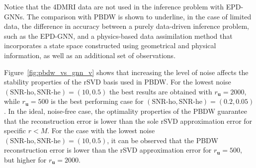 Notice that the 4DMRI data are not used in the inference problem with EPD-GNNs. The comparison with PBDW is shown to underline, in the case of limited data, the difference in accuracy between a purely data-driven inference problem, such as the EPD-GNN,  and a physics-based data assimilation method that incorporates a state space
constructed using geometrical and physical information, as well as an additional set of observations.

Figure~\ref{fig:pbdw_vs_gnn_v} shows that increasing the level of noise affects the stability properties of the rSVD basis used in PBDW. For the lowest noise
$(\text{SNR-ho}, \text{SNR-he})=(10, 0.5)$  the best results are obtained with $r_{\mathbf u} = 2000$, while $r_{\mathbf u} = 500$ is the best performing case for $(\text{SNR-ho}, \text{SNR-he})=(0.2, 0.05)$.
%
In the ideal, noise-free case, the optimality properties of the PBDW guarantee that the reconstruction error is lower than the sole rSVD approximation error 
for specific $r<M$. For the case with the lowest noise $(\text{SNR-ho}, \text{SNR-he})=(10, 0.5)$, it can be observed that the PBDW reconstruction error
is lower than the rSVD approximation error for $r_{\mathbf u}=500$, but higher for $r_{\mathbf u}=2000$.

